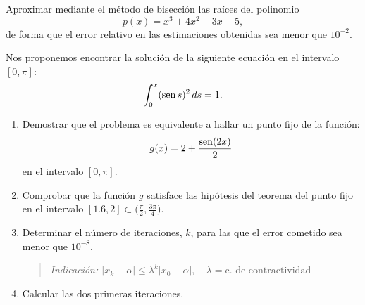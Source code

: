 \begin{EjerciciosPropuestos}
  \begin{problema}
    Aproximar mediante el método de bisección las raíces del polinomio
    $$
    p(x) = x^3 + 4x^2 -3x -5,
    $$
    de forma que el error relativo en las estimaciones obtenidas sea
    menor que $10^{-2}$.
  \end{problema}
  \begin{problema}
    Nos proponemos encontrar la solución de la siguiente ecuación en
    el intervalo $[0,\pi]$:
    $$
    \int_0^x (\operatorname{sen} s)^2 \, ds = 1.
    $$

    \begin{enumerate}
    \item Demostrar que el problema es equivalente a hallar un punto
      fijo de la función:
      $$
      g(x)=2 + \frac{\operatorname{sen}(2x)}{2}
      $$
      en el intervalo $[0,\pi]$.
    \item Comprobar que la función $g$ satisface las hipótesis del
      teorema del punto fijo en el intervalo $\displaystyle [1.6,2]\subset
      \bigg(\frac{\pi}{2},\frac{3\pi}{4}\bigg)$.
    \item Determinar el número de iteraciones, $k$, para las que el
      error cometido sea menor que $10^{-8}$.
      \begin{quote}\em\small
        Indicación:
        $|x_k-\alpha|\le \lambda^k|x_0-\alpha|,
        \quad\lambda=\text{c. de contractividad}$
      \end{quote}
    \item Calcular las dos primeras iteraciones.
    \end{enumerate}
  \end{problema}



\end{EjerciciosPropuestos}
